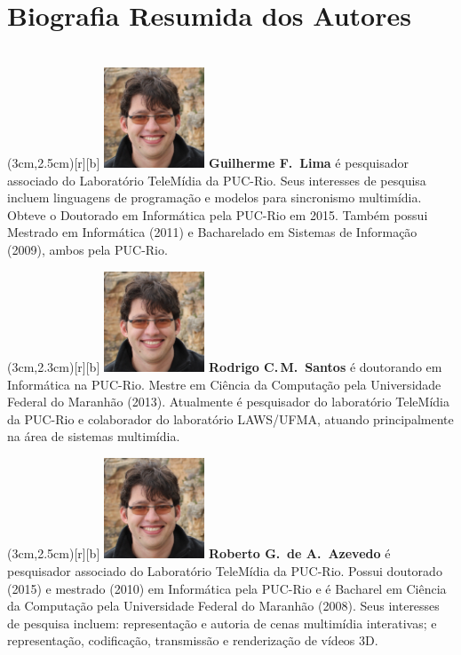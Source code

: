 \documentclass{SBCbookchapter}
\begin{document}
\section*{Biografia Resumida dos Autores}

~\\

\parpic(3cm,2.5cm)[r][b]{%
  \includegraphics[width=3cm,height=3cm]{photos/roberto}
}
\noindent\textbf{Guilherme F.~Lima} é pesquisador associado do Laboratório
TeleMídia da PUC-Rio.  Seus interesses de pesquisa incluem linguagens de
programação e modelos para sincronismo multimídia.  Obteve o Doutorado em
Informática pela PUC-Rio em 2015.  Também possui Mestrado em Informática (2011)
e Bacharelado em Sistemas de Informação (2009), ambos pela PUC-Rio.
\vspace{1cm}

\parpic(3cm,2.3cm)[r][b]{%
  \includegraphics[width=3cm,height=3cm]{photos/roberto}
}
\noindent\textbf{Rodrigo C.\,M.~Santos} é doutorando em Informática na PUC-Rio.
Mestre em Ciência da Computação pela Universidade Federal do Maranhão (2013).
Atualmente é pesquisador do laboratório TeleMídia da PUC-Rio e colaborador do
laboratório LAWS/UFMA, atuando principalmente na área de sistemas multimídia.
\vspace{1cm}

\parpic(3cm,2.5cm)[r][b]{%
  \includegraphics[width=3cm,height=3cm]{photos/roberto}
}
\noindent\textbf{Roberto G.\, de A.~Azevedo} é pesquisador associado do
Laboratório TeleMídia da PUC-Rio. Possui doutorado (2015) e mestrado (2010) em
Informática pela PUC-Rio e é Bacharel em Ciência da Computação pela
Universidade Federal do Maranhão (2008). Seus interesses de pesquisa incluem:
representação e autoria de cenas multimídia interativas; e representação,
codificação, transmissão e renderização de vídeos 3D.
\end{document}
